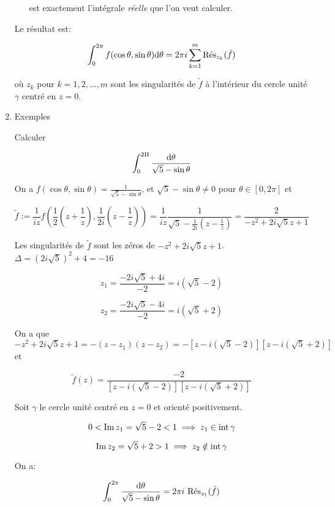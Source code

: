 \begin{enumerate}[label=\alph*)]
\begin{itemize}
    est exactement l'intégrale \textit{réelle} que l'on veut calculer.
    \end{itemize}

    Le résultat est:
    
    \[ \int_0^{2\pi} f(\cos \theta, \sin \theta) \dth = 2\pi i \sum_{k = 1}^m \Res_{z_k}(\tilde{f}) \]
    
    où $z_k$ pour $k = 1, 2, \ldots, m$ sont les singularités de $\tilde{f}$ à l'intérieur du cercle unité $\gamma$ centré en $z = 0$.
    
    \item Exemples
    
    \begin{example}[1]
        Calculer
        
        \[ \int_0^{2\Pi} \frac{\dth}{\sqrt{5} - \sin \theta} \]
        
        On a $f(\cos \theta, \sin \theta) = \frac{1}{\sqrt{5} - \sin \theta}$, et $\sqrt{5} - \sin \theta \neq 0$ pour $\theta \in [0, 2\pi]$ et
        
        \[ \tilde{f} := \frac{1}{iz} f\left(\frac{1}{2} \left(z + \frac{1}{z}\right), \frac{1}{2i} \left(z - \frac{1}{z}\right)\right) = \frac{1}{iz} \frac{1}{\sqrt{5} - \frac{1}{2i} \left(z - \frac{1}{z}\right)} = \frac{2}{-z^2 + 2i\sqrt{5}z + 1} \]
        
        Les singularités de $\tilde{f}$ sont les zéros de $-z^2 + 2i\sqrt{5}z + 1$. $\Delta = (2i\sqrt{5})^2 + 4 = -16$
        
        \[ z_1 = \frac{-2i\sqrt{5} + 4i}{-2} = i(\sqrt{5} - 2) \]
        
        \[ z_2 = \frac{-2i\sqrt{5} - 4i}{-2} = i(\sqrt{5} + 2) \]
        
        On a que $-z^2 + 2i\sqrt{5}z + 1 = -(z - z_1)(z - z_2) = - \left[ z - i(\sqrt{5} - 2) \right] \left[ z - i(\sqrt{5} + 2) \right]$ et
        
        \[ \tilde{f}(z) = \frac{-2}{\left[ z - i(\sqrt{5} - 2) \right] \left[ z - i(\sqrt{5} + 2) \right]} \]
        
        Soit $\gamma$ le cercle unité centré en $z = 0$ et orienté positivement.
        
        \[ 0 < \Imp z_1 = \sqrt{5} - 2 < 1 \implies z_1 \in \inte \gamma  \]
        
        \[ \Imp z_2 = \sqrt{5} + 2 > 1 \implies z_2 \notin \inte \gamma \]
        
        On a:
        
        \[ \int_0^{2\pi} \frac{\dth}{\sqrt{5} - \sin \theta} = 2\pi i \ \Res_{z_1} (\tilde{f}) \]
        

\end{example}
\end{enumerate}
